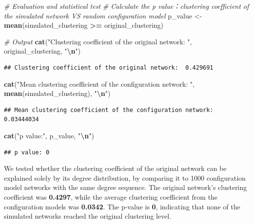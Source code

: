 \documentclass[
]{article}
\newenvironment{Shaded}{\begin{snugshade}}{\end{snugshade}}
\newcommand{\CommentTok}[1]{\textcolor[rgb]{0.56,0.35,0.01}{\textit{#1}}}
\newcommand{\FunctionTok}[1]{\textcolor[rgb]{0.13,0.29,0.53}{\textbf{#1}}}
\newcommand{\NormalTok}[1]{#1}
\newcommand{\OtherTok}[1]{\textcolor[rgb]{0.56,0.35,0.01}{#1}}
\newcommand{\SpecialCharTok}[1]{\textcolor[rgb]{0.81,0.36,0.00}{\textbf{#1}}}
\newcommand{\StringTok}[1]{\textcolor[rgb]{0.31,0.60,0.02}{#1}}
\begin{document}
\begin{Shaded}
\begin{Highlighting}[]
\CommentTok{\# Evaluation and statistical test}
\CommentTok{\# Calculate the p value：clustering coefficient of the simulated network VS random configuration model}
\NormalTok{p\_value }\OtherTok{\textless{}{-}} \FunctionTok{mean}\NormalTok{(simulated\_clustering }\SpecialCharTok{\textgreater{}=}\NormalTok{ original\_clustering)}

\CommentTok{\# Output}
\FunctionTok{cat}\NormalTok{(}\StringTok{"Clustering coefficient of the original network: "}\NormalTok{, original\_clustering, }\StringTok{"}\SpecialCharTok{\textbackslash{}n}\StringTok{"}\NormalTok{)}
\end{Highlighting}
\end{Shaded}

\begin{verbatim}
## Clustering coefficient of the original network:  0.429691
\end{verbatim}

\begin{Shaded}
\begin{Highlighting}[]
\FunctionTok{cat}\NormalTok{(}\StringTok{"Mean clustering coefficient of the configuration network: "}\NormalTok{, }\FunctionTok{mean}\NormalTok{(simulated\_clustering), }\StringTok{"}\SpecialCharTok{\textbackslash{}n}\StringTok{"}\NormalTok{)}
\end{Highlighting}
\end{Shaded}

\begin{verbatim}
## Mean clustering coefficient of the configuration network:  0.03444034
\end{verbatim}

\begin{Shaded}
\begin{Highlighting}[]
\FunctionTok{cat}\NormalTok{(}\StringTok{"p value:"}\NormalTok{, p\_value, }\StringTok{"}\SpecialCharTok{\textbackslash{}n}\StringTok{"}\NormalTok{)}
\end{Highlighting}
\end{Shaded}

\begin{verbatim}
## p value: 0
\end{verbatim}

We tested whether the clustering coefficient of the original network can
be explained solely by its degree distribution, by comparing it to 1000
configuration model networks with the same degree sequence. The original
network's clustering coefficient was \textbf{0.4297}, while the average
clustering coefficient from the configuration models was
\textbf{0.0342}. The p-value is \textbf{0}, indicating that none of the
simulated networks reached the original clustering level.
\end{document}

